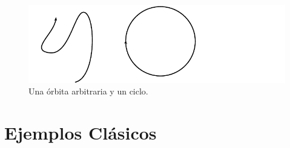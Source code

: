 \documentclass[11pt]{book}
\theoremstyle{definition}
\numberwithin{definition}{section}
\theoremstyle{theorem}
\numberwithin{theorem}{section}
\numberwithin{lemma}{section}
\numberwithin{corollary}{section}
\theoremstyle{plain}
\numberwithin{example}{section}
\begin{document}
\begin{figure}[!ht] \centering
	\includegraphics[scale=1.1]{figures/orbita-tipos.pdf}
	\caption{Una órbita arbitraria y un ciclo.}
\end{figure}

\section{Ejemplos Clásicos}
\end{document}
